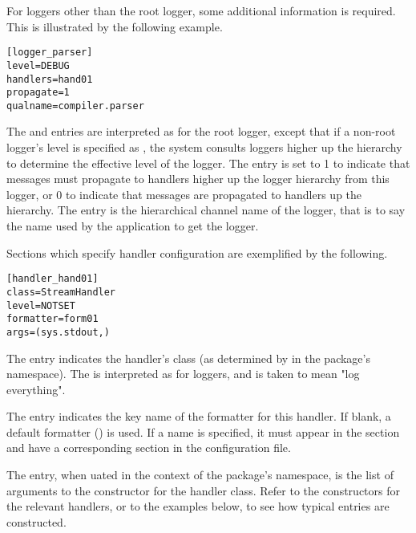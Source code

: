For loggers other than the root logger, some additional information is
required. This is illustrated by the following example.

\begin{verbatim}
[logger_parser]
level=DEBUG
handlers=hand01
propagate=1
qualname=compiler.parser
\end{verbatim}

The  and  entries are interpreted as for
the root logger, except that if a non-root logger's level is specified
as , the system consults loggers higher up the hierarchy
to determine the effective level of the logger. The 
entry is set to 1 to indicate that messages must propagate to handlers
higher up the logger hierarchy from this logger, or 0 to indicate that
messages are  propagated to handlers up the hierarchy. The
 entry is the hierarchical channel name of the logger,
that is to say the name used by the application to get the logger.

Sections which specify handler configuration are exemplified by the
following.

\begin{verbatim}
[handler_hand01]
class=StreamHandler
level=NOTSET
formatter=form01
args=(sys.stdout,)
\end{verbatim}

The  entry indicates the handler's class (as determined by
 in the  package's namespace). The
 is interpreted as for loggers, and  is taken
to mean "log everything".

The  entry indicates the key name of the formatter for
this handler. If blank, a default formatter
() is used. If a name is specified, it
must appear in the \code{[formatters]} section and have a
corresponding section in the configuration file.

The  entry, when uated in the context of
the  package's namespace, is the list of arguments to
the constructor for the handler class. Refer to the constructors for
the relevant handlers, or to the examples below, to see how typical
entries are constructed.

